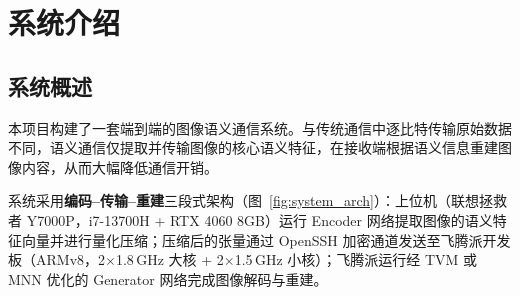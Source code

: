 \documentclass[lang=cn,a4paper,newtx,citestyle=gb7714-2015,bibstyle=gb7714-2015]{elegantpaper}
\begin{document}
\section{系统介绍}

\subsection{系统概述}

本项目构建了一套端到端的图像语义通信系统。与传统通信中逐比特传输原始数据不同，语义通信仅提取并传输图像的核心语义特征，在接收端根据语义信息重建图像内容，从而大幅降低通信开销\cite{semcom}。

系统采用\textbf{编码--传输--重建}三段式架构（图~\ref{fig:system_arch}）：上位机（联想拯救者 Y7000P，i7-13700H + RTX 4060 8GB）运行 Encoder 网络提取图像的语义特征向量并进行量化压缩；压缩后的张量通过 OpenSSH 加密通道发送至飞腾派开发板（ARMv8，2$\times$1.8\,GHz 大核 + 2$\times$1.5\,GHz 小核）；飞腾派运行经 TVM 或 MNN 优化的 Generator 网络完成图像解码与重建。
\end{document}
